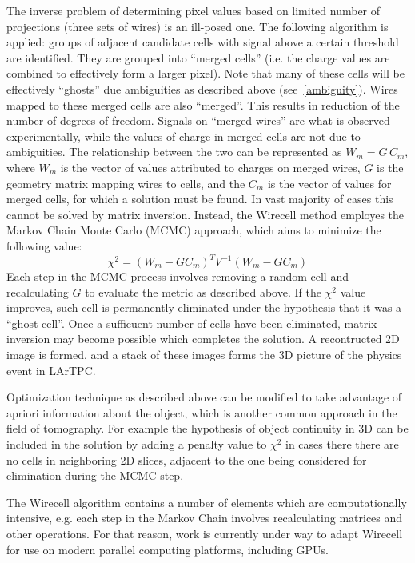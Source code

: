 \documentclass[a4paper]{jpconf}
\begin{document}
\noindent
The inverse problem of determining pixel values based on limited number of projections (three sets of wires) is an ill-posed one.
The following algorithm is applied: groups of adjacent candidate cells with signal above a certain
threshold are identified. They are grouped into ``merged cells'' (i.e. the charge values are combined to effectively form a larger pixel).
Note that many of these cells will be effectively ``ghosts'' due ambiguities as described above  (see~\ref{ambiguity}).
Wires mapped to these merged cells are also ``merged''. This results in reduction of the number of degrees of freedom. Signals on ``merged wires''
are what is observed experimentally, while the values of charge in merged cells are not due to ambiguities. The relationship
between the two can be represented as $W_m=G$\,$C_m$, where $W_m$ is the vector of values attributed to charges on merged wires, $G$ is
the geometry matrix mapping wires to cells, and the $C_m$ is the vector of values for merged cells, for which a solution must be found. In vast majority
of cases this cannot be solved by matrix inversion. Instead, the Wirecell method employes the Markov Chain Monte Carlo (MCMC) approach, which aims
to minimize the following value:
$$\chi^2=(W_m-GC_m)^TV^{-1}(W_m-GC_m)$$
Each step in the MCMC process involves removing a random cell and recalculating $G$ to evaluate the metric as described above. If the $\chi^2$ value
improves, such cell is permanently eliminated under the hypothesis that it was a ``ghost cell''. Once a sufficuent number of cells have been eliminated,
matrix inversion may become possible which completes the solution. A recontructed 2D image is formed, and a stack of these images forms the 3D
picture of the physics event in LArTPC.

Optimization technique as described above can be modified to take advantage of apriori information about the object, which is another common
approach in the field of tomography. For example the hypothesis of object continuity in 3D can be included in the solution by adding a penalty
value to $\chi^2$ in cases there there are no cells in neighboring 2D slices, adjacent to the one being considered for elimination during the MCMC step.

The Wirecell algorithm contains a number of elements which are computationally intensive, e.g. each step in the Markov Chain involves recalculating
matrices and other operations. For that reason, work is currently under way to adapt Wirecell for use on modern parallel computing platforms,
including GPUs.
\end{document}
